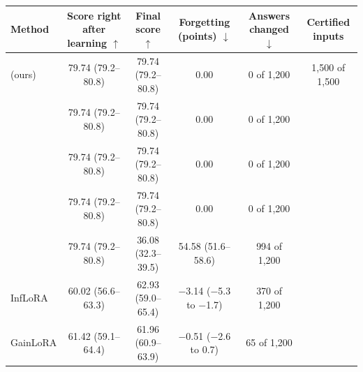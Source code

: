 \begin{tabular}{lccccc}
    \toprule
    Method & \shortstack[c]{Score\\right after\\learning $\uparrow$} & \shortstack[c]{Final\\score $\uparrow$} & \shortstack[c]{Forgetting\\(points) $\downarrow$} & \shortstack[c]{Answers\\changed $\downarrow$} & Certified inputs \\
    \midrule
    \cert{} (ours) & 79.74 {\scriptsize(79.2--80.8)} & 79.74 {\scriptsize(79.2--80.8)} & 0.00 & 0 of 1{,}200 & 1{,}500 of 1{,}500 \\
    \nearest{} & 79.74 {\scriptsize(79.2--80.8)} & 79.74 {\scriptsize(79.2--80.8)} & 0.00 & 0 of 1{,}200 &  \\
    \centre{} & 79.74 {\scriptsize(79.2--80.8)} & 79.74 {\scriptsize(79.2--80.8)} & 0.00 & 0 of 1{,}200 &  \\
    \keyswitch{} & 79.74 {\scriptsize(79.2--80.8)} & 79.74 {\scriptsize(79.2--80.8)} & 0.00 & 0 of 1{,}200 &  \\
    \plain{} & 79.74 {\scriptsize(79.2--80.8)} & 36.08 {\scriptsize(32.3--39.5)} & 54.58 {\scriptsize(51.6--58.6)} & 994 of 1{,}200 &  \\
    \midrule
    InfLoRA & 60.02 {\scriptsize(56.6--63.3)} & 62.93 {\scriptsize(59.0--65.4)} & $-$3.14 {\scriptsize($-$5.3 to $-$1.7)} & 370 of 1{,}200 &  \\
    GainLoRA & 61.42 {\scriptsize(59.1--64.4)} & 61.96 {\scriptsize(60.9--63.9)} & $-$0.51 {\scriptsize($-$2.6 to 0.7)} & 65 of 1{,}200 &  \\
    \bottomrule
\end{tabular}
